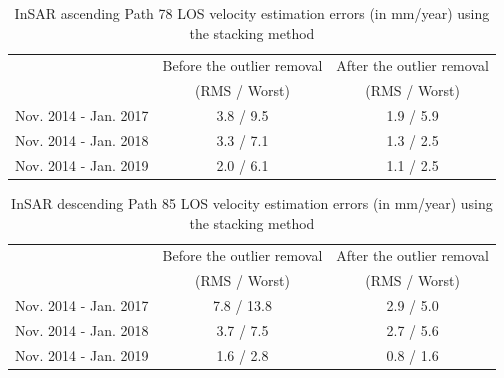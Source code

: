\begin{table}
	\caption{InSAR ascending Path 78 LOS velocity estimation errors (in mm/year) using the stacking method}
	\centering
	\begin{tabular}{|c|c|c|}
		\hline 
		& Before the outlier removal & After the outlier removal \\
		& (RMS / Worst) & (RMS / Worst) \\
		\hline
		Nov. 2014 - Jan. 2017 & 3.8 / 9.5         & 1.9 / 5.9       \\\hline
		Nov. 2014 - Jan. 2018 & 3.3 / 7.1         & 1.3 / 2.5       \\\hline
		Nov. 2014 - Jan. 2019 & 2.0 / 6.1         & 1.1 / 2.5       \\\hline                
	\end{tabular}
	\label{tab:gps-error-78}
\end{table}

\begin{table}
	\caption{InSAR descending Path 85 LOS velocity estimation errors (in mm/year) using the stacking method}
	\begin{tabular}{|c|c|c|}
		\hline 
		& Before the outlier removal & After the outlier removal \\
		& (RMS / Worst) & (RMS / Worst) \\
		\hline 
		Nov. 2014 - Jan. 2017 & 7.8 / 13.8                            & 2.9 / 5.0                          \\\hline
		Nov. 2014 - Jan. 2018 & 3.7 / 7.5                             & 2.7 / 5.6                          \\\hline
		Nov. 2014 - Jan. 2019 & 1.6 / 2.8                             & 0.8 / 1.6  \\\hline     
	\end{tabular}
	\label{tab:gps-error-85}
\end{table}




